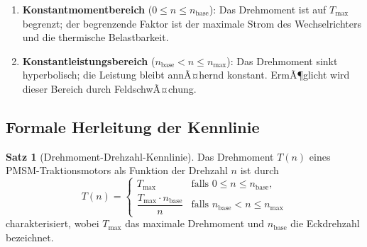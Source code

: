 ﻿\documentclass[a4paper,12pt]{article}
\theoremstyle{definition}
\newtheorem{satz}{Satz}
\begin{document}
\begin{enumerate}
    \item \textbf{Konstantmomentbereich} ($0 \leq n \leq n_{\mathrm{base}}$):
          Das Drehmoment ist auf $T_{\max}$ begrenzt; der begrenzende Faktor ist
          der maximale Strom des Wechselrichters und die thermische Belastbarkeit.
    \item \textbf{Konstantleistungsbereich} ($n_{\mathrm{base}} < n \leq n_{\max}$):
          Das Drehmoment sinkt hyperbolisch; die Leistung bleibt annÃ¤hernd konstant.
          ErmÃ¶glicht wird dieser Bereich durch FeldschwÃ¤chung.
\end{enumerate}

\subsection{Formale Herleitung der Kennlinie}

\begin{satz}[Drehmoment-Drehzahl-Kennlinie]
\label{satz:kennlinie}
    Das Drehmoment $T(n)$ eines PMSM-Traktionsmotors als Funktion der Drehzahl $n$
    ist durch
    \[
        T(n) =
        \begin{cases}
            T_{\max}                            & \text{falls } 0 \leq n \leq n_{\mathrm{base}}, \\[4pt]
            \dfrac{T_{\max} \cdot n_{\mathrm{base}}}{n} & \text{falls } n_{\mathrm{base}} < n \leq n_{\max}
        \end{cases}
    \]
    charakterisiert, wobei $T_{\max}$ das maximale Drehmoment und $n_{\mathrm{base}}$
    die Eckdrehzahl bezeichnet.
\end{satz}
\end{document}
